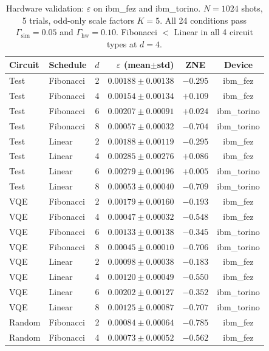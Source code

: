 \documentclass[10pt,letterpaper]{article}
\begin{document}
\begin{table}[H]
\caption{Hardware validation: $\varepsilon$ on ibm\_fez and ibm\_torino.
  $N=1024$ shots, 5 trials, odd-only scale factors $K=5$.
  All 24 conditions pass $\Gamma_{\mathrm{sim}}=0.05$ and
  $\Gamma_{\mathrm{hw}}=0.10$.
  Fibonacci $<$ Linear in all 4 circuit types at $d=4$.}
\label{tab:hardware}
\centering\small
\setlength{\tabcolsep}{4pt}
\begin{tabular}{llcrcc}
\toprule
Circuit & Schedule & $d$ & $\varepsilon$ (mean$\pm$std) & ZNE & Device \\
\midrule
Test    & Fibonacci & 2 & $0.00188\pm0.00138$ & $-0.295$ & ibm\_fez \\
Test    & Fibonacci & 4 & $0.00154\pm0.00134$ & $+0.109$ & ibm\_fez \\
Test    & Fibonacci & 6 & $0.00207\pm0.00091$ & $+0.024$ & ibm\_torino \\
Test    & Fibonacci & 8 & $0.00057\pm0.00032$ & $-0.704$ & ibm\_torino \\
Test    & Linear    & 2 & $0.00188\pm0.00119$ & $-0.295$ & ibm\_fez \\
Test    & Linear    & 4 & $0.00285\pm0.00276$ & $+0.086$ & ibm\_fez \\
Test    & Linear    & 6 & $0.00279\pm0.00196$ & $+0.005$ & ibm\_torino \\
Test    & Linear    & 8 & $0.00053\pm0.00040$ & $-0.709$ & ibm\_torino \\
\midrule
VQE     & Fibonacci & 2 & $0.00179\pm0.00160$ & $-0.193$ & ibm\_fez \\
VQE     & Fibonacci & 4 & $0.00047\pm0.00032$ & $-0.548$ & ibm\_fez \\
VQE     & Fibonacci & 6 & $0.00133\pm0.00138$ & $-0.345$ & ibm\_torino \\
VQE     & Fibonacci & 8 & $0.00045\pm0.00010$ & $-0.706$ & ibm\_torino \\
VQE     & Linear    & 2 & $0.00098\pm0.00038$ & $-0.183$ & ibm\_fez \\
VQE     & Linear    & 4 & $0.00120\pm0.00049$ & $-0.550$ & ibm\_fez \\
VQE     & Linear    & 6 & $0.00202\pm0.00127$ & $-0.352$ & ibm\_torino \\
VQE     & Linear    & 8 & $0.00125\pm0.00087$ & $-0.707$ & ibm\_torino \\
\midrule
Random  & Fibonacci & 2 & $0.00084\pm0.00064$ & $-0.785$ & ibm\_fez \\
Random  & Fibonacci & 4 & $0.00073\pm0.00052$ & $-0.562$ & ibm\_fez \\

\end{tabular}
\end{table}
\end{document}
